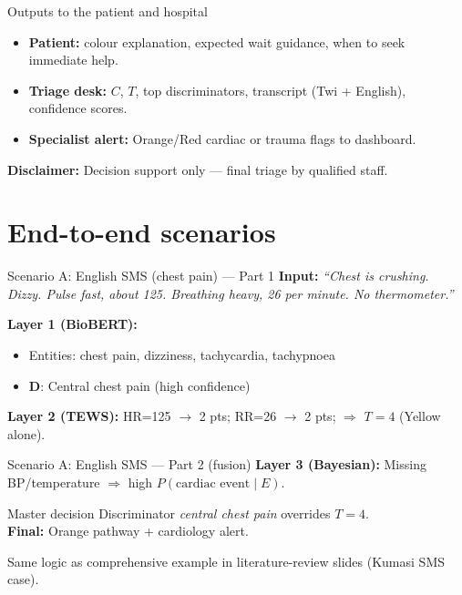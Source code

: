 \documentclass[aspectratio=169,11pt]{beamer}
\newcommand{\bcol}[2][blue!70!black]{\textcolor{#1}{#2}}
\begin{document}
\begin{frame}{Outputs to the patient and hospital}
	\begin{itemize}
		\item \textbf{Patient:} colour explanation, expected wait guidance, when to seek immediate help.
		\item \textbf{Triage desk:} $C$, $T$, top discriminators, transcript (Twi + English), confidence scores.
		\item \textbf{Specialist alert:} Orange/Red cardiac or trauma flags to dashboard.
	\end{itemize}

	\vspace{0.3em}
	\textbf{Disclaimer:} Decision support only --- final triage by qualified staff.
\end{frame}

\section{End-to-end scenarios}

\begin{frame}{Scenario A: English SMS (chest pain) --- Part 1}
	\textbf{Input:} \textit{``Chest is crushing. Dizzy. Pulse fast, about 125. Breathing heavy, 26 per minute. No thermometer.''}

	\vspace{0.3em}
	\textbf{Layer 1 (BioBERT):}
	\begin{itemize}
		\item Entities: chest pain, dizziness, tachycardia, tachypnoea
		\item $\mathbf{D}$: Central chest pain (high confidence)
	\end{itemize}

	\textbf{Layer 2 (TEWS):} HR=125 $\to$ 2 pts; RR=26 $\to$ 2 pts; $\Rightarrow$ $T=4$ (Yellow alone).
\end{frame}

\begin{frame}{Scenario A: English SMS --- Part 2 (fusion)}
	\textbf{Layer 3 (Bayesian):} Missing BP/temperature $\Rightarrow$ high $P(\text{cardiac event} \mid E)$.

	\vspace{0.3em}
	\begin{block}{Master decision}
		Discriminator \textit{central chest pain} overrides $T=4$.\\
		\textbf{Final:} \bcol[triageOrange]{Orange pathway} + cardiology alert.
	\end{block}

	\vspace{0.2em}
	\small Same logic as comprehensive example in literature-review slides (Kumasi SMS case).
\end{frame}
\end{document}
